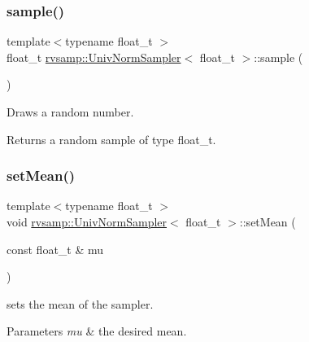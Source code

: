 \subsubsection{\texorpdfstring{sample()}{sample()}}
{\footnotesize\ttfamily template$<$typename float\+\_\+t $>$ \\
float\+\_\+t \hyperlink{classrvsamp_1_1UnivNormSampler}{rvsamp\+::\+Univ\+Norm\+Sampler}$<$ float\+\_\+t $>$\+::sample (\begin{DoxyParamCaption}{ }\end{DoxyParamCaption})}



Draws a random number. 

\begin{DoxyReturn}{Returns}
a random sample of type float\+\_\+t. 
\end{DoxyReturn}
\mbox{\label{classrvsamp_1_1UnivNormSampler_a9f9281d2cd88d82d251686ea9b9d4182}} 
\subsubsection{\texorpdfstring{set\+Mean()}{setMean()}}
{\footnotesize\ttfamily template$<$typename float\+\_\+t $>$ \\
void \hyperlink{classrvsamp_1_1UnivNormSampler}{rvsamp\+::\+Univ\+Norm\+Sampler}$<$ float\+\_\+t $>$\+::set\+Mean (\begin{DoxyParamCaption}\item[{const float\+\_\+t \&}]{mu }\end{DoxyParamCaption})}



sets the mean of the sampler. 


\begin{DoxyParams}{Parameters}
{\em mu} & the desired mean. \\
\hline
\end{DoxyParams}
\mbox{\label{classrvsamp_1_1UnivNormSampler_a77923ac7ff44866f2d6b50e75d97d119}} 
